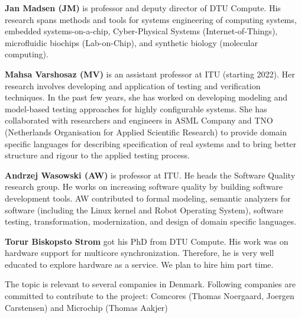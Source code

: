 \documentclass[fleqn,12pt]{article}
\begin{document}
{\bf Jan Madsen (JM)} is professor and deputy director of DTU Compute.
His research spans methods
and tools for systems engineering of computing systems, embedded systems-on-a-chip,
Cyber-Physical Systems (Internet-of-Things), microfluidic biochips (Lab-on-Chip), and
synthetic biology (molecular computing).


{\bf Mahsa Varshosaz (MV)} is an assistant professor at ITU (starting 2022). Her research involves developing and application of testing and verification techniques. In the past few years, she has worked on developing modeling and model-based testing approaches for highly configurable systems. She has collaborated with researchers and engineers in ASML Company and TNO (Netherlands Organisation for Applied Scientific Research) to provide domain specific languages for describing specification of real systems and to bring better structure and rigour to the applied testing process.

{\bf Andrzej Wasowski (AW)} is professor at ITU. He heads the Software Quality research group.  He works on increasing software quality by building software development tools. AW contributed to formal modeling, semantic analyzers for software (including the Linux kernel and Robot Operating System), software testing, transformation, modernization, and design of domain specific languages.


{\bf Torur Biskopsto Strom} got his PhD from DTU Compute. His work was on hardware support for multicore synchronization.
Therefore, he is very well educated to explore hardware as a service. We plan to hire him part time.

The topic is relevant to several companies in Denmark. Following companies are committed to contribute to the project: 
Comcores (Thomas Noergaard, Joergen Carstensen) and Microchip (Thomas Aakjer)
\end{document}
